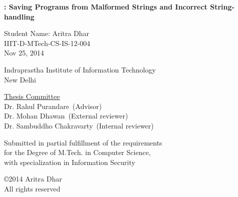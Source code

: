 

\def\addrone{IIIT-Delhi, Okhla Phase 3}
\def\addrtwo{New Delhi, India}

\begin{center}
\end{center}


\def\degree{M.Tech. in Computer Science with Specialization in Information Security}


\def\submissiondate{December 08, 2014}

\def\supervisorone{Dr. Rahul Purandare}
\def\external{Dr. Mohan Dhawan}
\def\internal{Dr. Sambuddho Chakravarty}

%
%
%
%
%
%

\thispagestyle{empty}

\begin{center}

{\LARGE \bf {\tool: Saving Programs from Malformed Strings and Incorrect
String-handling}

 }  
 \vspace{.3in}
 
 {\Large{Student Name: Aritra Dhar}} \\  
 \vspace{.1in} 
 IIIT-D-MTech-CS-IS-12-004 \\

 Nov 25, 2014 \\
  
    \vspace{.35in}

  \vspace{.25in}

{Indraprastha Institute of Information Technology\\
New Delhi}

\vspace{.35in}  {\underline{Thesis Committee}} \\ 
\supervisorone~(Advisor) \\
\external~(External reviewer) \\
\internal~(Internal reviewer)
  \\ \vspace{.35in}


 {Submitted in partial fulfillment of the requirements \\for the Degree of M.Tech. in Computer Science, \\ with specialization in Information Security}

\vspace{1.2in}


\copyright 2014 Aritra Dhar \\ All rights reserved \\
\vspace{.8in}


\end{center}


